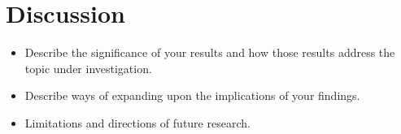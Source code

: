 \section{Discussion}

\begin{itemize}
  \item Describe the significance of your results and how those results address the topic under investigation.
  \item Describe ways of expanding upon the implications of your findings.
  \item Limitations and directions of future research.
\end{itemize}

